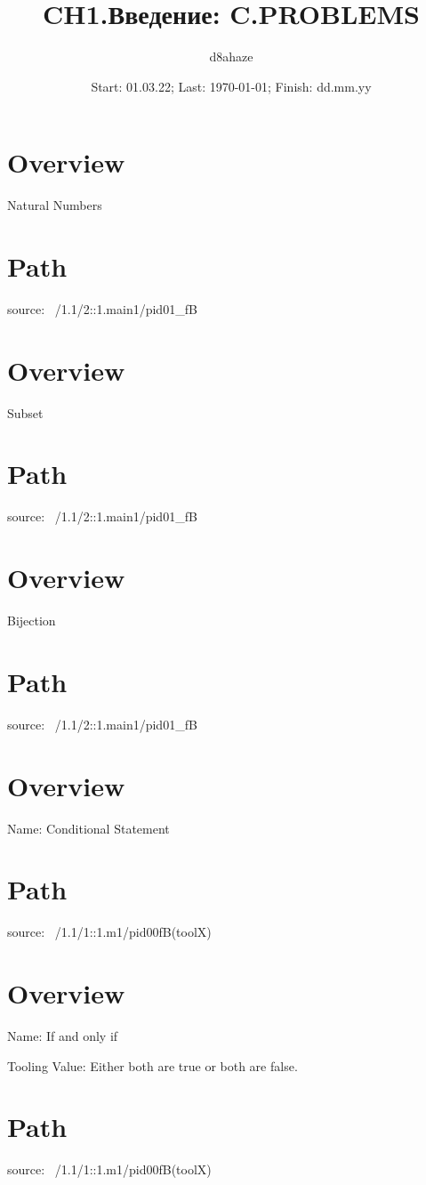 \documentclass{spaceD}
\author{d8ahaze}
\date{Start: 01.03.22; Last: \today; Finish: dd.mm.yy}
\title{CH1.Введение: C.PROBLEMS} %
\begin{document}
 \maketitle

\dsec %

\section{Overview}

Natural Numbers

\section{Path}

source:  ~/1.1/2::1.main1/pid01\_fB

\vspace{5mm}
\dsec %

\section{Overview}

Subset

\section{Path}

source:  ~/1.1/2::1.main1/pid01\_fB

\vspace{5mm}
\dsec

\section{Overview}

Bijection

\section{Path}

source:  ~/1.1/2::1.main1/pid01\_fB

\vspace{5mm}
\dsec

\section{Overview}

Name: Conditional Statement

\section{Path}

source:  ~/1.1/1::1.m1/pid00fB(toolX)

\vspace{5mm}
\dsec

\section{Overview}\label{vtIFF}

Name: If and only if

Tooling Value: Either both are true or both are false.

\section{Path}

source:  ~/1.1/1::1.m1/pid00fB(toolX)
\end{document}
